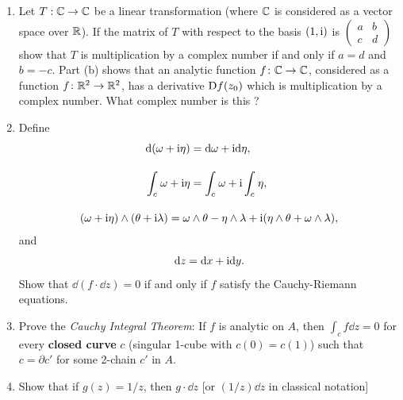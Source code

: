 \begin{problems}
{\begin{enumerate}[label=(\alph*)]
                \textit{Hint}:Use the fact that $\lim_{z\to z_0}{[f(z)-f(z_0)]/(z-z_0)}$ must 
                be the same for $z=z_0+(x+\R{i}\cdot 0)$ and $z=z_0+(0+\R{i}\cdot y)$ with 
                $x,y\to 0$. (The converse is also true, if $u$ and $v$ are continuously differentiable;
                this is more difficult to prove.)
            \item Let $T:\mathbb{C}\to \mathbb{C}$ be a linear transformation (where $\mathbb{C}$ is considered 
                as a vector space over $\mathbb{R}$). If the matrix of $T$ with respect to the 
                basis $(1,\mathrm{i})$ is $\begin{pmatrix}a & b\\c & d\end{pmatrix}$ show that
                $T$ is multiplication by a complex number if and only if $a=d$ and $b=-c$. Part (b)
                shows that an analytic function $f\colon{}\mathbb{C}\to\mathbb{C}$, considered as a function $f\colon{}\mathbb{R}^2\to\mathbb{R}^2$,
                has a derivative $\mathrm{D}f(z_0)$ which is multiplication by a complex number. What complex number
                is this ?
            \item Define%
                \begin{align*}
                    \mathrm{d}(\omega + \mathrm{i}\eta) & = \mathrm{d}\omega + \mathrm{i}\mathrm{d}\eta, \\[1em]
                    \int_{c}^{}{\omega + \mathrm{i}\eta} & = \int_{c}^{}\omega + \mathrm{i}\int_{c}^{}\eta, \\[1em]
                    (\omega+\mathrm{i}\eta)\wedge(\theta+\mathrm{i}\lambda)
                        = \omega&\wedge\theta - \eta\wedge\lambda + \mathrm{i}(\eta\wedge\theta + \omega\wedge\lambda),
                \end{align*}
                and 
                \begin{align*}
                    \mathrm{d} z = \mathrm{d} x + \mathrm{i}\mathrm{d} y.
                \end{align*}
                Show that $\dd(f\cdot\dd z)=0$ if and only if $f$ satisfy the Cauchy-Riemann equations.
            \item Prove the \textit{Cauchy Integral Theorem}: If $f$ is analytic on $A$,
                then $\int_c f \dd z = 0$ for every \textbf{closed curve} $c$ (singular 1-cube with
                $c(0) = c(1)$) such that $c = \partial c'$ for some 2-chain $c'$ in $A$.
            \item Show that if $g(z)=1/z$, then $g\cdot\dd z$ [or $(1/z)\dd z$ in classical notation]

\end{enumerate}}
\end{problems}
